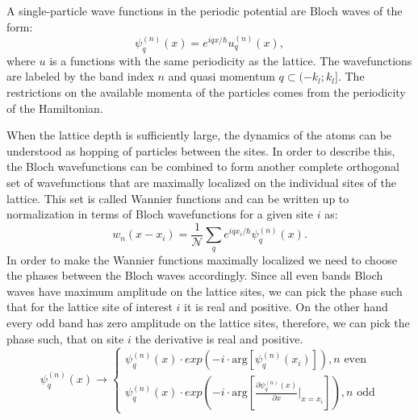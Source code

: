 A single-particle wave functions in the periodic potential are Bloch waves of the form:
\begin{equation}
\psi^{(n)}_q (x) = e^{iqx/\hbar} u_q^{(n)} (x),
\end{equation}
where $u$ is a functions with the same periodicity as the lattice. The wavefunctions are labeled by the band index $n$ and quasi momentum $q \subset (-k_l; k_l]$. The restrictions on the available momenta of the particles comes from the periodicity of the Hamiltonian.

When the lattice depth is sufficiently large, the dynamics of the atoms can be understood as hopping of particles between the sites. In order to describe this, the Bloch wavefunctions can be combined to form another complete orthogonal set of wavefunctions that are maximally localized on the individual sites of the lattice. This set is called Wannier functions and can be written up to normalization in terms of Bloch wavefunctions for a given site $i$ as:
\begin{equation}
w_n(x-x_i) = \frac{1}{\mathcal{N}} \sum_q e^{iqx_i/\hbar} \psi_q^{(n)}(x).
\end{equation}
In order to make the Wannier functions maximally localized we need to choose the phases between the Bloch waves accordingly. Since all even bands Bloch waves have maximum amplitude on the lattice sites, we can pick the phase such that for the lattice site of interest $i$ it is real and positive. On the other hand every odd band has zero amplitude on the lattice sites, therefore, we can pick the phase such, that on site $i$ the derivative is real and positive.
\begin{equation}
\psi_q^{(n)}(x) \rightarrow
\begin{cases}
\psi_q^{(n)}(x) \cdot exp(-i \cdot \textrm{arg}[\psi_q^{(n)}(x_i)]), n \textrm{ even}\\
\psi_q^{(n)}(x) \cdot exp(-i \cdot  \textrm{arg}[\frac{\partial \psi_q^{(n)}(x)}{\partial x}|_{x=x_i}]), n \textrm{ odd}
\end{cases}
\end{equation}


